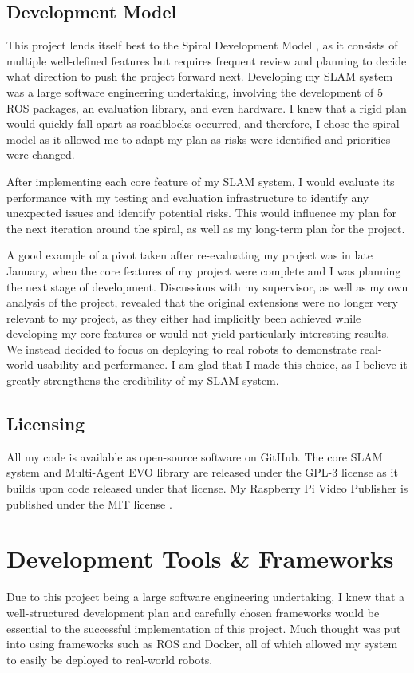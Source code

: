 \subsection{Development Model}
\label{sec:development-model}
This project lends itself best to the Spiral Development Model \autocite{59}, as it consists of multiple well-defined features but requires frequent review and planning to decide what direction to push the project forward next. Developing my SLAM system was a large software engineering undertaking, involving the development of 5 ROS packages, an evaluation library, and even hardware. I knew that a rigid plan would quickly fall apart as roadblocks occurred, and therefore, I chose the spiral model as it allowed me to adapt my plan as risks were identified and priorities were changed.

After implementing each core feature of my SLAM system, I would evaluate its performance with my testing and evaluation infrastructure to identify any unexpected issues and identify potential risks. This would influence my plan for the next iteration around the spiral, as well as my long-term plan for the project.

A good example of a pivot taken after re-evaluating my project was in late January, when the core features of my project were complete and I was planning the next stage of development. Discussions with my supervisor, as well as my own analysis of the project, revealed that the original extensions were no longer very relevant to my project, as they either had implicitly been achieved while developing my core features or would not yield particularly interesting results. We instead decided to focus on deploying to real robots to demonstrate real-world usability and performance. I am glad that I made this choice, as I believe it greatly strengthens the credibility of my SLAM system.

\subsection{Licensing}
\label{sec:licensing}
All my code is available as open-source software on GitHub. The core SLAM system and Multi-Agent EVO library are released under the GPL-3 license \autocite{gplv3} as it builds upon code released under that license. My Raspberry Pi Video Publisher is published under the MIT license \autocite{mit}.

\section{Development Tools \& Frameworks}
\label{sec:development-tools-and-frameworks}
Due to this project being a large software engineering undertaking, I knew that a well-structured development plan and carefully chosen frameworks would be essential to the successful implementation of this project. Much thought was put into using frameworks such as ROS and Docker, all of which allowed my system to easily be deployed to real-world robots.

